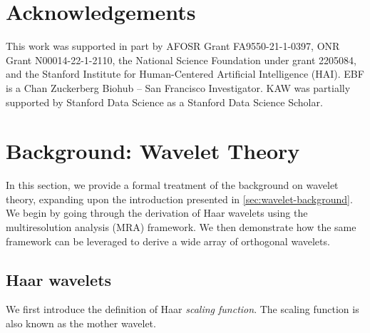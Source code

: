 \documentclass{article}
\theoremstyle{plain}
\theoremstyle{definition}
\theoremstyle{remark}
\begin{document}
\section*{Acknowledgements}



This work was supported in part by AFOSR Grant FA9550-21-1-0397, ONR Grant N00014-22-1-2110, the National Science Foundation under grant 2205084, and the Stanford Institute for Human-Centered Artificial Intelligence (HAI). EBF is a Chan Zuckerberg Biohub – San Francisco Investigator.
KAW was partially supported by Stanford Data Science as a Stanford Data Science Scholar.






\clearpage
\appendix
\onecolumn



\section{Background: Wavelet Theory}
\label{app:wavelets}

In this section, we provide a formal treatment of the background on wavelet theory, expanding upon the introduction presented in \cref{sec:wavelet-background}.
We begin by going through the derivation of Haar wavelets using the multiresolution analysis (MRA) framework. 
We then demonstrate how the same framework can be leveraged to derive a wide array of orthogonal wavelets.   

\subsection{Haar wavelets}
\label{app:haar-wavelets}

We first introduce the definition of Haar \emph{scaling function}. 
The scaling function is also known as the mother wavelet.
\end{document}
